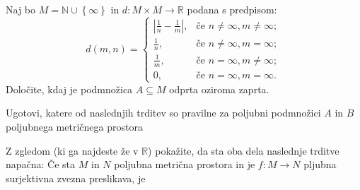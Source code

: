 \documentclass[11pt,a4paper]{exam}
\renewcommand{\subset}{\subseteq}
\renewcommand{\{}{\lbrace}
\renewcommand{\}}{\rbrace}
\begin{document}
\begin{questions}
	\question Naj bo $M = \mathbb{N} \cup \left\{ \infty \right\}$ in $d: M \times M \to \mathbb{R}$ podana s predpisom:
	\[d(m,n) = 
		\begin{cases}
			\left| \frac{1}{n} - \frac{1}{m} \right|,  & \text{če } n \neq \infty, m\neq \infty; \\
			\frac{1}{n},  & \text{če } n \neq \infty, m =  \infty; \\
			\frac{1}{m},  & \text{če } n = \infty, m\neq \infty; \\
			0,  & \text{če } n = \infty, m = \infty.
		\end{cases}
	\]
	Določite, kdaj je podmnožica $A \subset M$ odprta oziroma zaprta.

	\question Ugotovi, katere od naslednjih trditev so pravilne za poljubni podmnožici $A$ in $B$ poljubnega metričnega prostora

	\question Z zgledom (ki ga najdeste že v $\mathbb{R}$) pokažite, da sta oba dela naslednje trditve napačna: Če sta $M$ in $N$ poljubna metrična prostora in je $f: M \to N$ pljubna surjektivna zvezna preslikava, je
		
\end{questions}
\end{document}
